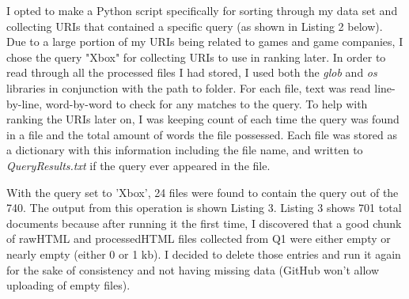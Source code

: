 \documentclass[12pt]{article}
\begin{document}
I opted to make a Python script specifically for sorting through my data set and collecting URIs that contained a specific query (as shown in Listing 2 below). Due to a large portion of my URIs being related to games and game companies, I chose the query "Xbox" for collecting URIs to use in ranking later. In order to read through all the processed files I had stored, I used both the \emph{glob} and \emph{os} libraries in conjunction with the path to folder. For each file, text was read line-by-line, word-by-word to check for any matches to the query. To help with ranking the URIs later on, I was keeping count of each time the query was found in a file and the total amount of words the file possessed. Each file was stored as a dictionary with this information including the file name, and written to \emph{QueryResults.txt} if the query ever appeared in the file.



With the query set to 'Xbox', 24 files were found to contain the query out of the 740. The output from this operation is shown Listing 3. Listing 3 shows 701 total documents because after running it the first time, I discovered that a good chunk of rawHTML and processedHTML files collected from Q1 were either empty or nearly empty (either 0 or 1 kb). I decided to delete those entries and run it again for the sake of consistency and not having missing data (GitHub won't allow uploading of empty files). 
\end{document}
